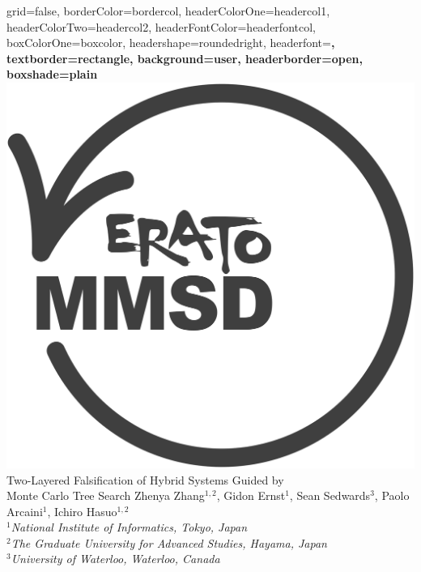 \documentclass[a0paper,portrait]{baposter}
\begin{document}
\begin{poster}{
grid=false,
borderColor=bordercol, %
headerColorOne=headercol1, %
headerColorTwo=headercol2, %
headerFontColor=headerfontcol, %
boxColorOne=boxcolor, %
headershape=roundedright, %
headerfont=\Large\sf\bf, %
textborder=rectangle,
background=user,
headerborder=open, %
boxshade=plain
}
{\includegraphics[scale=0.2]{erato.png}}
%
%
{\huge    {Two-Layered Falsification of Hybrid Systems Guided by \\Monte Carlo Tree Search} } %
{\vspace{0.3em} \smaller Zhenya Zhang$^{1,2}$, Gidon Ernst$^1$, Sean Sedwards$^3$,  Paolo Arcaini$^1$, Ichiro Hasuo$^{1,2}$  \\  %
  
\smaller $^1$\it {National Institute of Informatics, Tokyo, Japan}\\ $^2$\it{The Graduate University for Advanced Studies, Hayama, Japan}  \\ $^3$\it{University of Waterloo, Waterloo, Canada} } %


\end{poster}
\end{document}

